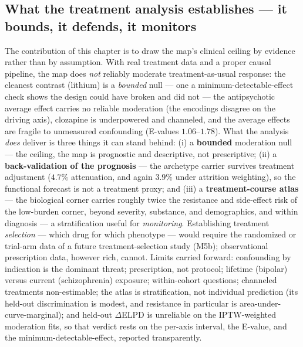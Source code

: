 \subsection{What the treatment analysis establishes --- it bounds, it defends, it monitors}
\label{sub:m5limits}

\begin{openbox}
The contribution of this chapter is to draw the map's clinical ceiling by evidence rather than by assumption.
With real treatment data and a proper causal pipeline, the map does \emph{not} reliably moderate
treatment-as-usual response: the cleanest contrast (lithium) is a \emph{bounded} null --- one a
minimum-detectable-effect check shows the design could have broken and did not --- the antipsychotic average
effect carries no reliable moderation (the encodings disagree on the driving axis), clozapine is underpowered
and channeled, and the average effects are fragile to unmeasured confounding (E-values $1.06$--$1.78$). What the
analysis \emph{does} deliver is three things it can stand behind: (i) a \textbf{bounded} moderation null --- the
ceiling, the map is prognostic and descriptive, not prescriptive; (ii) a \textbf{back-validation of the
prognosis} --- the archetype carrier survives treatment adjustment ($4.7\%$ attenuation, and again $3.9\%$ under
attrition weighting), so the functional forecast is not a treatment proxy; and (iii) a \textbf{treatment-course
atlas} --- the biological corner carries roughly twice the resistance and side-effect risk of the low-burden
corner, beyond severity, substance, and demographics, and within diagnosis --- a stratification useful for
\emph{monitoring}. Establishing treatment \emph{selection} --- which drug for which phenotype --- would require
the randomized or trial-arm data of a future treatment-selection study (M5b); observational prescription data,
however rich, cannot. Limits carried forward: confounding by indication is the dominant threat; prescription,
not protocol; lifetime (bipolar) versus current (schizophrenia) exposure; within-cohort questions; channeled
treatments non-estimable; the atlas is stratification, not individual prediction (its held-out discrimination is
modest, and resistance in particular is area-under-curve-marginal); and held-out $\Delta$ELPD is unreliable on
the IPTW-weighted moderation fits, so that verdict rests on the per-axis interval, the E-value, and the
minimum-detectable-effect, reported transparently.
\end{openbox}
